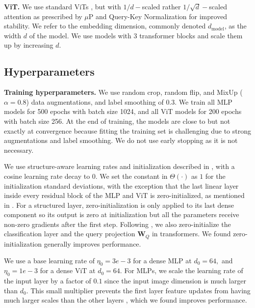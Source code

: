 \documentclass{article}
\newcommand{\mbf}[1]{{\boldsymbol{\mathbf{#1}}}}
\newcommand{\bm}{\mbf}
\theoremstyle{plain}
\theoremstyle{definition}
\theoremstyle{remark}
\newcommand{\mup}{$\mu$P\xspace}
\begin{document}
\noindent \textbf{ViT.} \quad
We use standard ViTs \citep{dosovitskiy2022vit}, but with $1/d-$scaled rather $1/\sqrt{d}-$scaled attention as prescribed by \mup \cite{yang2021v} and Query-Key Normalization \citep{henry2020query, wortsman2023small} for improved stability. We refer to the embedding dimension, commonly denoted $d_\mathrm{model}$, as the width $d$ of the model. We use models with $3$ transformer blocks and scale them up by increasing $d.$

\subsection{Hyperparameters}
\noindent \textbf{Training hyperparameters.} \quad
We use random crop, random flip, and MixUp ($\alpha=0.8$) data augmentations, and label smoothing of $0.3.$ We train all MLP models for 500 epochs with batch size 1024, and all ViT models for 200 epochs with batch size 256. At the end of training, the models are close to but not exactly at convergence because fitting the training set is challenging due to strong augmentations and label smoothing. We do not use early stopping as it is not necessary.

We use structure-aware
learning rates and initialization described in , with a cosine learning rate decay to $0$. We set the constant in $\Theta(\cdot)$ as $1$ for the initialization standard deviations, with the exception that the last linear layer inside every residual block of the MLP and ViT is zero-initialized, as mentioned in . For a structured layer, zero-initialization is only applied to its last dense component so its output is zero at initialization but all the parameters receive non-zero gradients after the first step. Following \cite{yang2021v}, we also zero-initialize the classification layer and the query projection $\bm{W}_Q$ in transformers. We found zero-initialization generally improves performance.

We use a base learning rate of $\eta_0 = 3e-3$ for a dense MLP at $d_0=64,$ and $\eta_0 = 1e-3$ for a dense ViT at $d_0=64.$ For MLPs, we scale the learning rate of the input layer by a factor of $0.1$ since the input image dimension is much larger than $d_0$. This small multiplier prevents the first layer feature updates from having much larger scales than the other layers \citep{yang2023spectral}, which we found improves performance.
\end{document}

